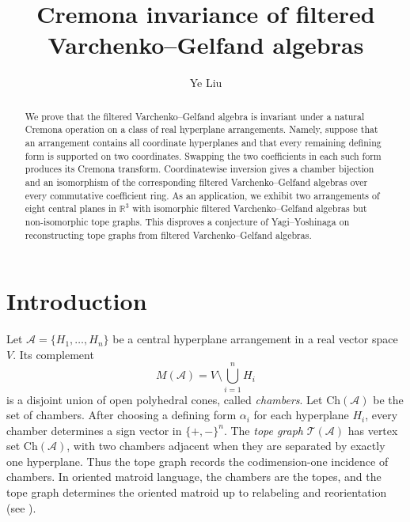 \documentclass{amsart}
\numberwithin{equation}{section}
\theoremstyle{plain}
\theoremstyle{remark}
\theoremstyle{definition}
\numberwithin{equation}{section}
\newcommand{\R}{\mathbb{R}}
\newcommand{\A}{\mathcal{A}}
\newcommand{\T}{\mathcal{T}}
\newcommand{\Ch}{\mathrm{Ch}}
\begin{document}
\title{Cremona invariance of filtered Varchenko--Gelfand algebras}



\author{Ye Liu}
\address{Department of Pure Mathematics, Xi'an Jiaotong-Liverpool University, Suzhou, Jiangsu 215123, P. R. China}





\date{}


\begin{abstract}
We prove that the filtered Varchenko--Gelfand algebra is invariant under a natural Cremona operation on a class of real hyperplane arrangements.  Namely, suppose that an arrangement contains all coordinate hyperplanes and that every remaining defining form is supported on two coordinates.  Swapping the two coefficients in each such form produces its Cremona transform.  Coordinatewise inversion gives a chamber bijection and an isomorphism of the corresponding filtered Varchenko--Gelfand algebras over every commutative coefficient ring.  As an application, we exhibit two arrangements of eight central planes in $\R^3$ with isomorphic filtered Varchenko--Gelfand algebras but non-isomorphic tope graphs. This disproves a conjecture of Yagi--Yoshinaga on reconstructing tope graphs from filtered Varchenko--Gelfand algebras.
\end{abstract}

\maketitle

\tableofcontents

\section{Introduction}


Let $\A=\{H_1,\ldots,H_n\}$ be a central hyperplane arrangement in a real vector space $V$.  Its complement 
\[
M(\A)=V\setminus \bigcup_{i=1}^nH_i
\]
is a disjoint union of open polyhedral cones, called \emph{chambers}. Let $\Ch(\A)$ be the set of chambers. After choosing a defining form $\alpha_i$ for each hyperplane $H_i$, every chamber determines a sign vector in $\{+,-\}^n$.  The \emph{tope graph} $\T(\A)$ has vertex set $\Ch(\A)$, with two chambers adjacent when they are separated by exactly one hyperplane.  Thus the tope graph records the codimension-one incidence of chambers.  In oriented matroid language, the chambers are the topes, and the tope graph determines the oriented matroid up to relabeling and reorientation (see \cite[Theorem~4.2.14]{Bjorner1999}).
\end{document}
